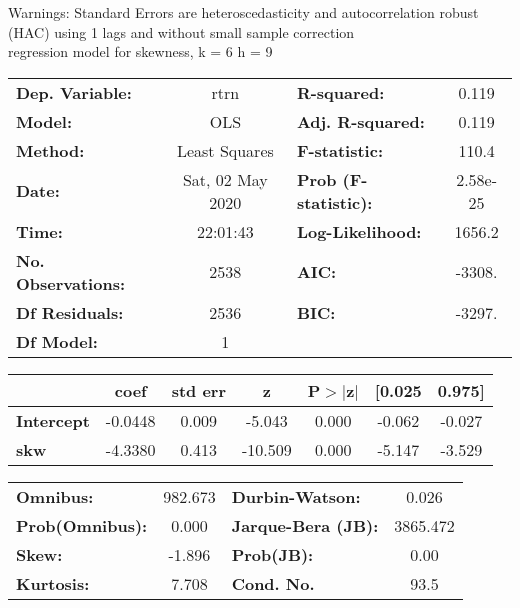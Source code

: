 Warnings: \newline
 [1] Standard Errors are heteroscedasticity and autocorrelation robust (HAC) using 1 lags and without small sample correction\\ 

regression model for skewness, k = 6 h = 9\begin{center}
\begin{tabular}{lclc}
\toprule
\textbf{Dep. Variable:}    &       rtrn       & \textbf{  R-squared:         } &     0.119   \\
\textbf{Model:}            &       OLS        & \textbf{  Adj. R-squared:    } &     0.119   \\
\textbf{Method:}           &  Least Squares   & \textbf{  F-statistic:       } &     110.4   \\
\textbf{Date:}             & Sat, 02 May 2020 & \textbf{  Prob (F-statistic):} &  2.58e-25   \\
\textbf{Time:}             &     22:01:43     & \textbf{  Log-Likelihood:    } &    1656.2   \\
\textbf{No. Observations:} &        2538      & \textbf{  AIC:               } &    -3308.   \\
\textbf{Df Residuals:}     &        2536      & \textbf{  BIC:               } &    -3297.   \\
\textbf{Df Model:}         &           1      & \textbf{                     } &             \\
\bottomrule
\end{tabular}
\begin{tabular}{lcccccc}
                   & \textbf{coef} & \textbf{std err} & \textbf{z} & \textbf{P$> |$z$|$} & \textbf{[0.025} & \textbf{0.975]}  \\
\midrule
\textbf{Intercept} &      -0.0448  &        0.009     &    -5.043  &         0.000        &       -0.062    &       -0.027     \\
\textbf{skw}       &      -4.3380  &        0.413     &   -10.509  &         0.000        &       -5.147    &       -3.529     \\
\bottomrule
\end{tabular}
\begin{tabular}{lclc}
\textbf{Omnibus:}       & 982.673 & \textbf{  Durbin-Watson:     } &    0.026  \\
\textbf{Prob(Omnibus):} &   0.000 & \textbf{  Jarque-Bera (JB):  } & 3865.472  \\
\textbf{Skew:}          &  -1.896 & \textbf{  Prob(JB):          } &     0.00  \\
\textbf{Kurtosis:}      &   7.708 & \textbf{  Cond. No.          } &     93.5  \\
\bottomrule
\end{tabular}
\end{center}

